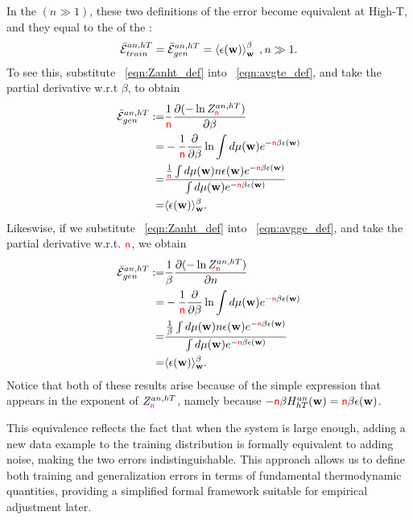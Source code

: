 In the \ThermodynamicLimit $(n \gg 1)$, these two definitions of the error become equivalent at High-T,
and they equal to the \ThermalAverage of the \EffectivePotential:
\begin{align}
  \bar{\mathcal{E}}_{train}^{an, hT} = \bar{\mathcal{E}}_{gen}^{an, hT} = \left\langle \epsilon({\mathbf{w}}) \right\rangle_{\mathbf w}^{\beta}\;,n\gg 1 .
\end{align}
To see this, substitute \EQN~\ref{eqn:Zanht_def} into \EQN~\ref{eqn:avgte_def}, and take the partial derivative w.r.t $\beta$, to obtain
\begin{align}
  \label{eqn:avgge_anhT}
  \bar{\mathcal{E}}_{gen}^{an, hT} :=&\frac{1}{{\color{red}\sf{n}}}\dfrac{\partial (-\ln Z^{an,hT}_{{\color{red}\sf{n}}})}{\partial \beta}  \\ \nonumber
   =& - \dfrac{1}{{\color{red}\sf{n}}}\dfrac{\partial}{\partial \beta}\ln\int d\mu({\mathbf{w}})e^{-{\color{red}\sf{n}}\beta\epsilon({\mathbf{w}})} \\  \nonumber
   =&  \dfrac{
              \tfrac{1}{{\color{red}\sf{n}}}  \int  d\mu({\mathbf{w}}) n\epsilon({\mathbf{w}}) e^{-{\color{red}\sf{n}}\beta\epsilon({\mathbf{w}})} 
             }{
              \int  d\mu({\mathbf{w}}) e^{-{\color{red}\sf{n}}\beta\epsilon({\mathbf{w}})} 
   } \\ \nonumber
   =&\langle\epsilon({\mathbf{w}}) \rangle_{{\mathbf{w}}}^{\beta} .
  \end{align}
Likeswise, if we substitute \EQN~\ref{eqn:Zanht_def} into \EQN~\ref{eqn:avgge_def}, and take the partial derivative w.r.t. ${\color{red}\sf{n}}$, we obtain
\begin{align}
  \label{eqn:avgte_anhT}
    \bar{\mathcal{E}}_{gen}^{an, hT}  :=& \frac{1}{\beta}\dfrac{\partial (-\ln Z^{an,hT}_{{\color{red}\sf{n}}})}{\partial n} \\ \nonumber
    =& - \dfrac{1}{{\color{red}\sf{n}}}\dfrac{\partial}{\partial \beta}\ln\int d\mu({\mathbf{w}})e^{-{\color{red}\sf{n}}\beta\epsilon({\mathbf{w}})} \\  \nonumber
   =&  \dfrac{
              \tfrac{1}{\beta}  \int  d\mu({\mathbf{w}}) n\epsilon({\mathbf{w}}) e^{-{\color{red}\sf{n}}\beta\epsilon({\mathbf{w}})} 
             }{
     \int  d\mu({\mathbf{w}}) e^{-{\color{red}\sf{n}}\beta\epsilon({\mathbf{w}})} 
   } \\ \nonumber
   =&\langle\epsilon({\mathbf{w}}) \rangle_{{\mathbf{w}}}^{\beta} .
\end{align}
Notice that both of these results arise because of the simple expression that appears in the exponent of $Z^{an,hT}_{{\color{red}\sf{n}}}$, namely because $-{\color{red}\sf{n}}\beta H^{an}_{hT}({\mathbf{w}})={\color{red}\sf{n}}\beta\epsilon({\mathbf{w}})$.


This equivalence reflects the fact that when the system is large enough, adding a new data example to the
training distribution is formally equivalent to adding noise, making the two errors indistinguishable.
This approach allows us to define both training and generalization errors in terms of fundamental thermodynamic quantities,
providing a simplified formal framework suitable for empirical adjustment later.

